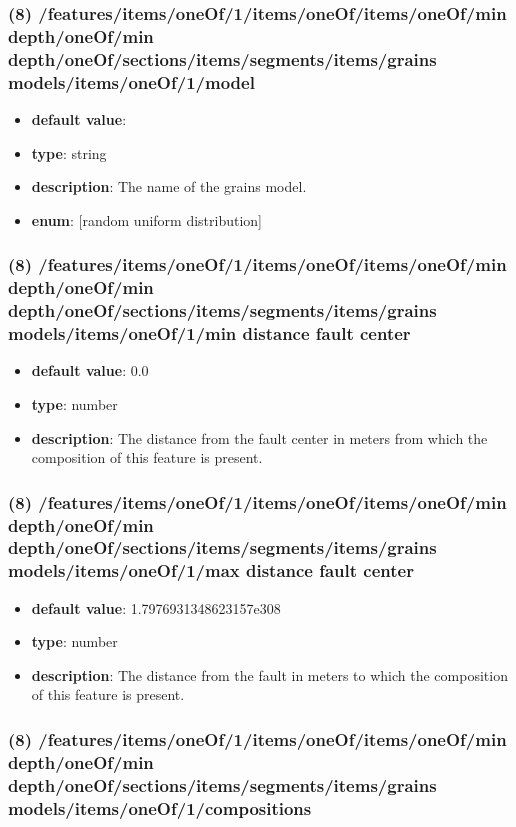 \subsubsection{(8) /features/items/oneOf/1/items/oneOf/items/oneOf/min depth/oneOf/min depth/oneOf/sections/items/segments/items/grains models/items/oneOf/1/model}
\begin{itemize}[leftmargin=8em]\item {\bf default value}: 
\item {\bf type}: string
\item {\bf description}: The name of the grains model.
\item {\bf enum}: [random uniform distribution]\end{itemize}\subsubsection{(8) /features/items/oneOf/1/items/oneOf/items/oneOf/min depth/oneOf/min depth/oneOf/sections/items/segments/items/grains models/items/oneOf/1/min distance fault center}
\begin{itemize}[leftmargin=8em]\item {\bf default value}: 0.0
\item {\bf type}: number
\item {\bf description}: The distance from the fault center in meters from which the composition of this feature is present.
\end{itemize}\subsubsection{(8) /features/items/oneOf/1/items/oneOf/items/oneOf/min depth/oneOf/min depth/oneOf/sections/items/segments/items/grains models/items/oneOf/1/max distance fault center}
\begin{itemize}[leftmargin=8em]\item {\bf default value}: 1.7976931348623157e308
\item {\bf type}: number
\item {\bf description}: The distance from the fault in meters to which the composition of this feature is present.
\end{itemize}\subsubsection{(8) /features/items/oneOf/1/items/oneOf/items/oneOf/min depth/oneOf/min depth/oneOf/sections/items/segments/items/grains models/items/oneOf/1/compositions}

